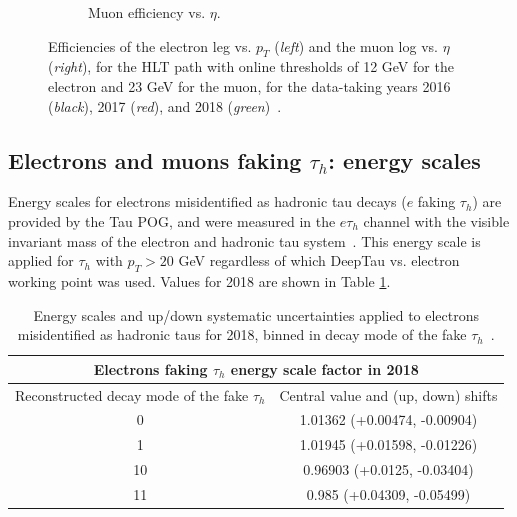\begin{figure}[ht]
\begin{subfigure}{0.45\textwidth}
        \caption{Muon efficiency vs. $\eta$.}
        \label{fig:muon_efficiency_vs_eta_emu}
    \end{subfigure}
    \caption[Efficiencies of the electron leg vs. $p_{T}$ (\textit{left}) and the muon log vs. $\eta$ (\textit{right}), for the HLT path with online thresholds of 12 GeV for the electron and 23 GeV for the muon, with the data-taking years 2016 through 2018 overlaid.]{Efficiencies of the electron leg vs. $p_{T}$ (\textit{left}) and the muon log vs. $\eta$ (\textit{right}), for the HLT path with online thresholds of 12 GeV for the electron and 23 GeV for the muon, for the data-taking years 2016 (\textit{black}), 2017 (\textit{red}), and 2018 (\textit{green})~\cite{CMS-DP-2019-025}.} 
\end{figure}


\subsection{Electrons and muons faking \texorpdfstring{$\tau_{h}$}{tauh}: energy scales}

Energy scales for electrons misidentified as hadronic tau decays ($e$ faking $\tau_{h}$) are provided by the Tau POG, and were measured in the $e\tau_{h}$ channel with the visible invariant mass of the electron and hadronic tau system~\cite{twiki_HiggsToTauTauWorkingLegacyRun2}. This energy scale is applied for $\tau_{h}$ with $p_{T} > 20$ GeV regardless of which DeepTau vs. electron working point was used. Values for 2018 are shown in Table \ref{table:electron-faking-tauh-FES-2018}.

\begin{table}[ht]
    \centering
    \begin{tabular}{|c|c|}
    \hline
    \multicolumn{2}{|c|}{Electrons faking $\tau_{h}$ energy scale factor in 2018}      \\ \hline
    \hline
    Reconstructed decay mode of the fake $\tau_{h}$  & Central value and (up, down) shifts \\ \hline
    0   & 1.01362 (+0.00474, -0.00904) \\
    1   & 1.01945 (+0.01598, -0.01226) \\
    10  & 0.96903 (+0.0125, -0.03404) \\
    11 & 0.985 (+0.04309, -0.05499) \\ \hline
    \end{tabular}
    \caption[Energy scales and up/down systematic uncertainties applied to electrons misidentified as hadronic taus.]{Energy scales and up/down systematic uncertainties applied to electrons misidentified as hadronic taus for 2018, binned in decay mode of the fake $\tau_{h}$~\cite{twiki_HiggsToTauTauWorkingLegacyRun2}.}
    \label{table:electron-faking-tauh-FES-2018}
\end{table}

